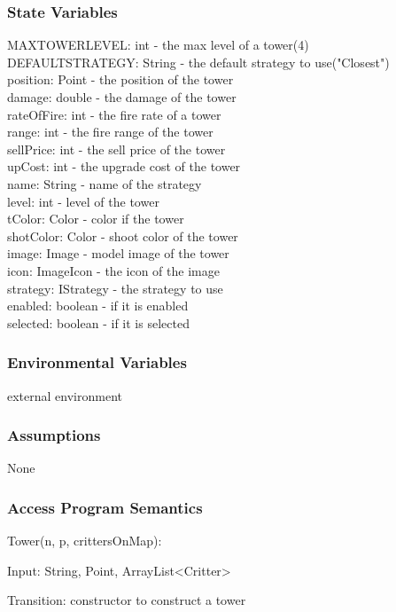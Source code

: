 \documentclass[12,english]{article}
\begin{document}
		\subsubsection{State Variables}
		MAXTOWERLEVEL: int - the max level of a tower(4)\\
		DEFAULTSTRATEGY: String - the default strategy to use("Closest")\\
		position: Point - the position of the tower\\
		damage: double - the damage of the tower\\
    	rateOfFire: int - the fire rate of a tower\\
	    range: int - the fire range of the tower\\
	    sellPrice: int - the sell price of the tower\\	
	    upCost: int - the upgrade cost of the tower\\
	    name: String - name of the strategy\\
	    level: int - level of the tower\\
	    tColor: Color - color if the tower\\
	    shotColor: Color - shoot color of the tower\\
	    image: Image - model image of the tower\\
        icon: ImageIcon - the icon of the image\\
        strategy: IStrategy - the strategy to use\\ 
        enabled: boolean - if it is enabled\\
        selected: boolean - if it is selected\\
		\subsubsection{Environmental Variables}
		\color{red} external environment \color{black}
		\subsubsection{Assumptions}
        None

		\subsubsection{Access Program Semantics}
		Tower(n, p, crittersOnMap):
		
		Input: String, Point, ArrayList<Critter>
		
		Transition: constructor to construct a tower
		
\end{document}
